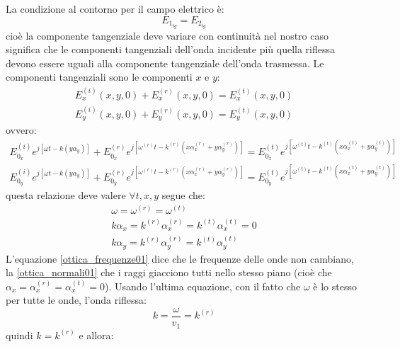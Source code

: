 La condizione al contorno per il campo elettrico è:
\begin{equation}
  E_{1_{tg}}=E_{2_{tg}}
\end{equation}
cioè la componente tangenziale deve variare con continuità nel nostro caso significa che le componenti tangenziali dell'onda incidente più quella riflessa devono essere uguali alla componente tangenziale dell'onda trasmessa. Le componenti tangenziali sono le componenti $x$ e $y$:
\begin{subequations}
  \begin{gather}
    E_x^{(i)}(x,y,0)+E_x^{(r)}(x,y,0)=E_x^{(t)}(x,y,0)\\
    E_y^{(i)}(x,y,0)+E_y^{(r)}(x,y,0)=E_y^{(t)}(x,y,0)
  \end{gather}
\end{subequations}
ovvero:
\begin{subequations}
  \begin{gather}
    E^{(i)}_{0_x}e^{j\left[\omega t-k\left(y\alpha_y\right)\right]}+E^{(r)}_{0_x}e^{j\left[\omega^{(r)} t-k^{(r)}(x\alpha_x^{(r)}+y\alpha_y^{(r)})\right]}=E^{(t)}_{0_x}e^{j\left[\omega^{(t)} t-k^{(t)}(x\alpha_x^{(t)}+y\alpha_y^{(t)})\right]}\\
    E^{(i)}_{0_y}e^{j\left[\omega t-k\left(y\alpha_y\right)\right]}+E^{(r)}_{0_y}e^{j\left[\omega^{(r)} t-k^{(r)}(x\alpha_x^{(r)}+y\alpha_y^{(r)})\right]}=E^{(t)}_{0_y}e^{j\left[\omega^{(t)} t-k^{(t)}(x\alpha_x^{(t)}+y\alpha_y^{(t)})\right]}
  \end{gather}
  \label{tante_ottica01}
\end{subequations}
questa relazione deve valere $\forall t,x,y$ segue che:
\begin{subequations}
  \begin{gather}
    \label{ottica_frequenze01}
    \omega=\omega^{(r)}=\omega^{(t)}\\
    \label{ottica_normali01}
    k\alpha_x=k^{(r)}\alpha_x^{(r)}=k^{(t)}\alpha_x^{(t)}=0\\
    k\alpha_y=k^{(r)}\alpha_y^{(r)}=k^{(t)}\alpha_y^{(t)}
  \end{gather}
\end{subequations}
L'equazione \eqref{ottica_frequenze01} dice che le frequenze delle onde non cambiano, la \eqref{ottica_normali01} che i raggi giacciono tutti nello stesso piano (cioè che $\alpha_x=\alpha_x^{(r)}=\alpha_x^{(t)}=0$). Usando l'ultima equazione, con il fatto che $\omega$ è lo stesso per tutte le onde, l'onda riflessa:
\[
  k=\frac{\omega}{v_1}=k^{(r)}
\]
quindi $k=k^{(r)}$ e allora:
